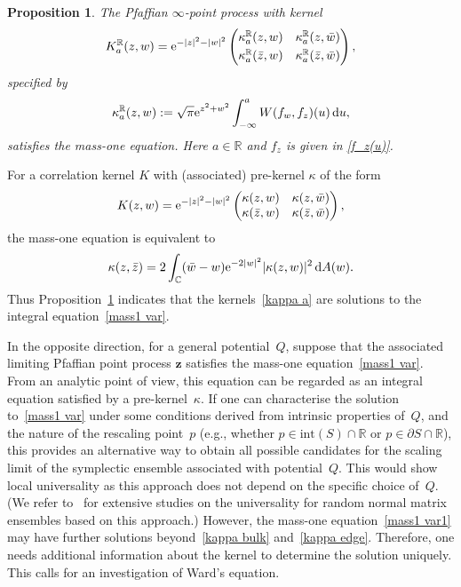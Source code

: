 \documentclass[pdftex]{sigma}
\numberwithin{equation}{section}
\newtheorem{Proposition}[Theorem]{Proposition}
 { \theoremstyle{definition}
\newtheorem{Definition}[Theorem]{Definition}
\newtheorem{Example}[Theorem]{Example}
\newtheorem{Remark}[Theorem]{Remark} }
\newcommand{\R}{{\mathbb R}}
\newcommand{\C}{{\mathbb C}}
\newcommand{\1}{\chi}
\begin{document}
\begin{Proposition} \label{Thm_mass1}
	The Pfaffian $\infty$-point process with kernel
	\begin{gather} \label{K Gkernel E}
		K_{a}^\R(z,w)={\rm e}^{-|z|^2-|w|^2}
		\begin{pmatrix}
			\kappa_{a}^\R (z,w) & \kappa_{a}^\R (z,\bar{w})
			\vspace{1mm}\\
			\kappa_{a}^\R (\bar{z},w) & \kappa_{a}^\R (\bar{z},\bar{w})
		\end{pmatrix},
	\end{gather}
	specified by
	\begin{gather} \label{kappa a}
		\kappa_{a}^\R(z,w)
		:= \sqrt{\pi} {\rm e}^{z^2+w^2} \int_{-\infty}^a W(f_w,f_z)(u) \,{\rm d}u,
	\end{gather}
	satisfies the mass-one equation. Here $a \in \R$ and $f_z$ is given in \eqref{f_z(u)}.
\end{Proposition}

For a correlation kernel $K$ with (associated) pre-kernel $\kappa$ of the form
\begin{gather} \label{K regular}
		K(z,w)={\rm e}^{-|z|^2-|w|^2}
		\begin{pmatrix}
			\kappa (z,w) & \kappa (z,\bar{w})
			\\
			\kappa (\bar{z},w) & \kappa (\bar{z},\bar{w})
		\end{pmatrix},
	\end{gather}
the mass-one equation is equivalent to{\samepage
\begin{gather} \label{mass1 var}
	\kappa(z,\bar{z})=2 \int_{ \C } (\bar{w}-w) {\rm e}^{ -2|w|^2 } |\kappa(z,w)|^2 \, {\rm d}A(w).
\end{gather}
Thus Proposition~\ref{Thm_mass1} indicates that the kernels~\eqref{kappa a} are solutions to the integral equa\-tion~\eqref{mass1 var}.$\!$}

In the opposite direction, for a general potential~$Q$, suppose that the associated limiting Pfaffian point process $\boldsymbol{z}$ satisfies the mass-one equation~\eqref{mass1 var}. From an analytic point of view, this equation can be regarded as an integral equation satisfied by a pre-kernel~$\kappa$.
If one can characterise the solution to~\eqref{mass1 var} under some conditions derived from intrinsic properties of~$Q$, and the nature of the rescaling point~$p$ (e.g., whether $p \in \textrm{int}(S) \cap \R$ or $p \in \partial S \cap \R$), this provides an alternative way to obtain all possible candidates for the scaling limit of the symplectic ensemble associated with potential~$Q$.
This would show local universality as this approach does not depend on the specific choice of~$Q$.
(We refer to~\cite{MR3975882,MR4030288} for extensive studies on the universality for random normal matrix ensembles based on this approach.)
However, the mass-one equation~\eqref{mass1 var1} may have further solutions beyond~\eqref{kappa bulk} and~\eqref{kappa edge}.
Therefore, one needs additional information about the kernel to determine the solution uniquely.
This calls for an investigation of Ward's equation.
\end{document}

